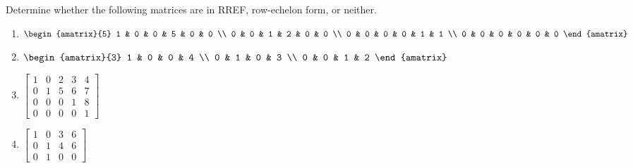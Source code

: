\documentclass[11pt]{exam}
\begin{document}
        \begin{questions}
            \item Determine whether the following matrices are in RREF, row-echelon form, or neither.
            \begin{enumerate}
                \item $\begin{amatrix}{5}
                    1 & 0 & 0 & 5 & 0 & 0 \\
                    0 & 0 & 1 & 2 & 0 & 0 \\
                    0 & 0 & 0 & 0 & 1 & 1 \\
                    0 & 0 & 0 & 0 & 0 & 0
                \end{amatrix}$
                \item $\begin{amatrix}{3}
                    1 & 0 & 0 & 4 \\
                    0 & 1 & 0 & 3 \\
                    0 & 0 & 1 & 2
                \end{amatrix}$
                \item $\begin{bmatrix}
                    1 & 0 & 2 & 3 & 4 \\
                    0 & 1 & 5 & 6 & 7 \\
                    0 & 0 & 0 & 1 & 8 \\
                    0 & 0 & 0 & 0 & 1
                \end{bmatrix}$
                \item $\begin{bmatrix}
                    1 & 0 & 3 & 6 \\
                    0 & 1 & 4 & 6 \\
                    0 & 1 & 0 & 0
                \end{bmatrix}$
            \end{enumerate}


\end{questions}
\end{document}
